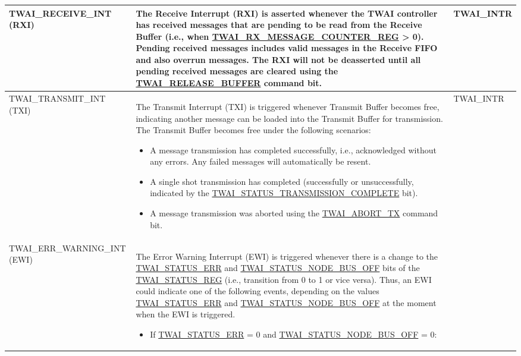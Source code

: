 \documentclass[main\_\_EN.tex]{subfiles}
\begin{document}
\begin{longtable}{ | L{5cm} | L{7cm} | L{3.5cm} | }
\label{int:TWAIRECEIVEINT}TWAI\_RECEIVE\_INT (RXI) &
The Receive Interrupt (RXI) is asserted whenever the TWAI controller has received messages that are pending to be read from the Receive Buffer (i.e., when \hyperref[regdesc:TWAIRXMESSAGECOUNTERREG]{TWAI\_RX\_MESSAGE\_COUNTER\_REG} > 0). Pending received messages includes valid messages in the Receive FIFO and also overrun messages. The RXI will not be deasserted until all pending received messages are cleared using the \hyperref[fielddesc:TWAIRELEASEBUFFER]{TWAI\_RELEASE\_BUFFER} command bit. &  TWAI\_INTR  \\ \hline
\label{int:TWAITRANSMITINT}TWAI\_TRANSMIT\_INT (TXI) &
The Transmit Interrupt (TXI) is triggered whenever Transmit Buffer becomes free, indicating another message can be loaded into the Transmit Buffer for transmission. The Transmit Buffer becomes free under the following scenarios:
\begin{itemize}
    \item A message transmission has completed successfully, i.e., acknowledged without any errors. Any failed messages will automatically be resent.
    \item A single shot transmission has completed (successfully or unsuccessfully, indicated by the \hyperref[fielddesc:TWAISTATUSTRANSMISSIONCOMPLETE]{TWAI\_STATUS\_TRANSMISSION\_COMPLETE} bit).
    \item A message transmission was aborted using the \hyperref[fielddesc:TWAIABORTTX]{TWAI\_ABORT\_TX} command bit.
\end{itemize}
 & TWAI\_INTR \\ \hline
\label{int:TWAIERRWARNINGINT}TWAI\_ERR\_WARNING\_INT (EWI) &
The Error Warning Interrupt (EWI) is triggered whenever there is a change to the \hyperref[fielddesc:TWAISTATUSERR]{TWAI\_STATUS\_ERR} and \hyperref[fielddesc:TWAISTATUSNODEBUSOFF]{TWAI\_STATUS\_NODE\_BUS\_OFF} bits of the \hyperref[regdesc:TWAISTATUSREG]{TWAI\_STATUS\_REG} (i.e., transition from 0 to 1 or vice versa). Thus, an EWI could indicate one of the following events, depending on the values \hyperref[fielddesc:TWAISTATUSERR]{TWAI\_STATUS\_ERR} and \hyperref[fielddesc:TWAISTATUSNODEBUSOFF]{TWAI\_STATUS\_NODE\_BUS\_OFF} at the moment when the EWI is triggered.
\begin{itemize}
    \item If \hyperref[fielddesc:TWAISTATUSERR]{TWAI\_STATUS\_ERR} = 0 and \hyperref[fielddesc:TWAISTATUSNODEBUSOFF]{TWAI\_STATUS\_NODE\_BUS\_OFF} = 0:
    \begin{itemize}

\end{itemize}
\end{itemize}
\end{longtable}
\end{document}
